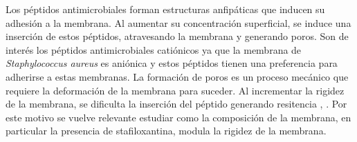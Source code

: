 Los p\'{e}ptidos antimicrobiales forman estructuras anfip\'{a}ticas que inducen su adhesi\'{o}n a la membrana. Al aumentar su concentraci\'{o}n superficial, se induce una inserci\'{o}n de estos p\'{e}ptidos, atravesando la membrana y generando poros. Son de inter\'{e}s los p\'{e}ptidos antimicrobiales cati\'{o}nicos ya que la membrana de \textit{Staphylococcus aureus} es ani\'{o}nica y estos p\'{e}ptidos tienen una preferencia para adherirse a estas membranas. La formaci\'{o}n de poros es un proceso mec\'{a}nico que requiere la deformaci\'{o}n de la membrana para suceder. Al incrementar la rigidez de la membrana, se dificulta la inserci\'{o}n del p\'{e}ptido generando resitencia \cite{Perez-LopezVariationsProperties}, \cite{Nagendra2011}. Por este motivo se vuelve relevante estudiar como la composici\'{o}n de la membrana, en particular la presencia de stafiloxantina, modula la rigidez de la membrana.
